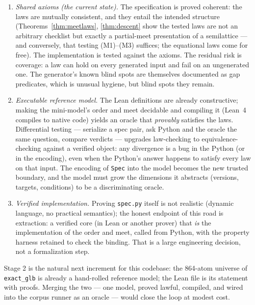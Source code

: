 \documentclass[11pt]{article}
\theoremstyle{definition}
\theoremstyle{remark}
\newcommand{\code}[1]{\texttt{#1}}
\begin{document}
\begin{enumerate}[itemsep=3pt]
\item \emph{Shared axioms (the current state).}  The specification is proved
coherent: the laws are mutually consistent, and they entail the intended
structure (Theorems~\ref{thm:meetlaws}, \ref{thm:descent} show the tested
laws are not an arbitrary checklist but exactly a partial-meet presentation
of a semilattice --- and conversely, that testing (M1)--(M3) suffices; the
equational laws come for free).  The implementation is tested against the
axioms.  The residual risk is coverage: a law can hold on every generated
input and fail on an ungenerated one.  The generator's known blind spots are
themselves documented as gap predicates, which is unusual hygiene, but
blind spots they remain.
\item \emph{Executable reference model.}  The Lean definitions are already
constructive; making the mini-model's order and meet decidable and compiling
it (Lean~4 compiles to native code) yields an oracle that \emph{provably}
satisfies the laws.  Differential testing --- serialize a spec pair, ask
Python and the oracle the same question, compare verdicts --- upgrades
law-checking to equivalence-checking against a verified object: any
divergence is a bug in the Python (or in the encoding), even when the
Python's answer happens to satisfy every law on that input.  The encoding of
\code{Spec} into the model becomes the new trusted boundary, and the model
must grow the dimensions it abstracts (versions, targets, conditions) to be
a discriminating oracle.
\item \emph{Verified implementation.}  Proving \code{spec.py} itself is not
realistic (dynamic language, no practical semantics); the honest endpoint of
this road is extraction: a verified core (in Lean or another prover) that
\emph{is} the implementation of the order and meet, called from Python, with
the property harness retained to check the binding.  That is a large
engineering decision, not a formalization step.
\end{enumerate}

Stage 2 is the natural next increment for this codebase: the 864-atom
universe of \code{exact\_glb} is already a hand-rolled reference model; the
Lean file is its statement with proofs.  Merging the two --- one model,
proved lawful, compiled, and wired into the corpus runner as an oracle ---
would close the loop at modest cost.

\end{document}
